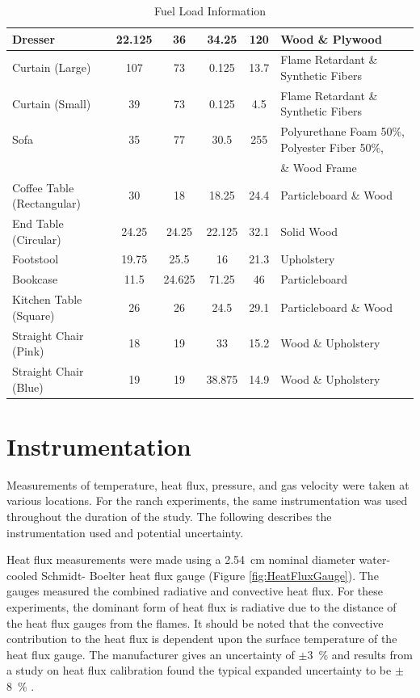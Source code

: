 \documentclass[12pt,oneside]{book}
\begin{document}
\begin{table}
{\begin{tabular}{|l|c|c|c|c|l|}
Dresser & 22.125 & 36 & 34.25 & 120 & Wood \& Plywood \\ \hline
Curtain (Large) & 107 & 73 & 0.125 & 13.7 & Flame Retardant \& Synthetic Fibers \\ \hline
Curtain (Small) & 39 & 73 & 0.125 & 4.5 & Flame Retardant \& Synthetic Fibers \\ \hline
Sofa & 35 & 77 & 30.5 & 255 & Polyurethane Foam 50\%, Polyester Fiber 50\%,\\&&&&& \& Wood Frame \\ \hline
Coffee Table (Rectangular) & 30 & 18 & 18.25 & 24.4 & Particleboard \& Wood \\ \hline
End Table (Circular) & 24.25 & 24.25 & 22.125 & 32.1 & Solid Wood \\ \hline
Footstool & 19.75 & 25.5 & 16 & 21.3 & Upholstery \\ \hline
Bookcase & 11.5 & 24.625 & 71.25 & 46 & Particleboard \\ \hline
Kitchen Table (Square) & 26 & 26 & 24.5 & 29.1 & Particleboard \& Wood \\ \hline
Straight Chair (Pink) & 18 & 19 & 33 & 15.2 & Wood \& Upholstery \\ \hline
Straight Chair (Blue) & 19 & 19 & 38.875 & 14.9 & Wood \& Upholstery \\ \hline
\end{tabular}}
\caption{Fuel Load Information}
\label{table:fuel_weights}
\end{table}

\section{Instrumentation}

Measurements of temperature, heat flux, pressure, and gas velocity were taken at various locations. For the ranch experiments, the same instrumentation was used throughout the duration of the study. The following describes the instrumentation used and potential uncertainty.

Heat flux measurements were made using a 2.54~cm nominal diameter water-cooled Schmidt- Boelter heat flux gauge (Figure \ref{fig:HeatFluxGauge}). The gauges measured the combined radiative and convective heat flux. For these experiments, the dominant form of heat flux is radiative due to the distance of the heat flux gauges from the flames. It should be noted that the convective contribution to the heat flux is dependent upon the surface temperature of the heat flux gauge. The manufacturer gives an uncertainty of $\pm$3~\% and results from a study on heat flux calibration found the typical expanded uncertainty to be $\pm$8~\% \cite{HeatFluxRoundRobin}.
\end{document}
